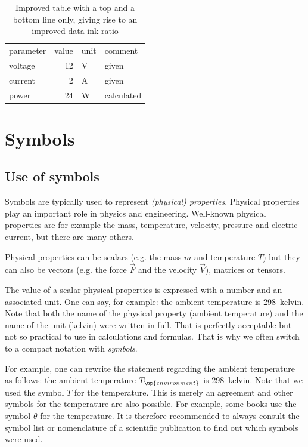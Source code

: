 \begin{table}\centering
    \caption{Improved table with a top and a bottom line only, giving rise to an improved data-ink ratio}\label{tab:demo2}
    \begin{tabular}{lrll}  
        \toprule
         parameter  &  value & unit         & comment\\[1ex]
         voltage    &  12   & \unit{\volt}    & given\\
         current    &  2    & \unit{\ampere}  & given\\
        power       &  24   & \unit{\watt}    & calculated\\
        \bottomrule
    \end{tabular}
\end{table}

\section{Symbols}\label{sec:formatsymbols}
\subsection{Use of symbols}
Symbols are typically used to represent \emph{(physical) properties}. Physical properties play an important role in physics and engineering. Well-known physical properties are for example the mass, temperature, velocity, pressure and electric current, but there are many others.

Physical properties can be scalars (e.g. the mass $m$ and temperature $T$) but they can also be vectors (e.g. the force $\vec{F}$ and the velocity $\vec{V}$), matrices or tensors.

The value of a scalar physical properties is expressed with a number and an associated unit. One can say, for example: the ambient temperature is 298~kelvin. Note that both the name of the physical property (ambient temperature) and the name of the unit (kelvin) were written in full. That is perfectly acceptable but not so practical to use in calculations and formulas. That is why we often switch to a compact notation with \emph{symbols}.

For example, one can rewrite the statement regarding the ambient temperature as follows: the ambient temperature $ T_\up{environment}$ is 298~kelvin. Note that we used the symbol $T$ for the temperature. This is merely an agreement and  other symbols for the temperature are also possible. For example, some books use the symbol $\theta$ for the temperature. It is therefore recommended to always consult the symbol list or nomenclature of a scientific publication to find out which symbols were used. 

